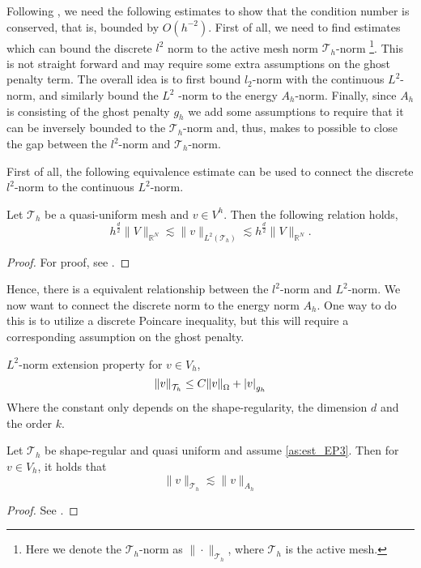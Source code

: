  Following \cite{gurkan2019stabilized}, we need the following estimates to show that the condition number is conserved, that is, bounded by $O( h^{-2}) $. First of all, we need to find estimates which can bound the discrete $l^{2}$ norm to the active
 mesh norm  $\mathcal{T} _{h}$-norm \footnote{Here we denote the $\mathcal{T} _{h}$-norm as $\| \cdot  \|_{\mathcal{T} _{h}  }^{  } $, where $\mathcal{T} _{h}$ is the active mesh.}. This is not straight forward and may require some extra
 assumptions on the ghost penalty term. The overall idea is to first bound $l_{2}$-norm with the continuous $L^{2}$-norm, and similarly bound the $L^{2}$ -norm to the energy $A_{h}$-norm. Finally, since $A_{h}$ is consisting of the ghost penalty $g_{h}$ we add
 some assumptions to require that it can be inversely bounded to the $\mathcal{T} _{h}$-norm and, thus, makes to possible to close the gap between the $l^{2}$-norm and $\mathcal{T} _{h}$-norm.

 First of all, the following equivalence estimate can be used to connect the discrete $l^{2}$-norm to the continuous $L^{2} $-norm.
 \begin{proposition}
 \label{prop:inverse_relation}
     Let $\mathcal{T}_{h} $ be a quasi-uniform mesh and $v \in V^{h}$. Then the following relation holds,
 \begin{equation}
 h^{\frac{d}{2}} \| V \|_{ \mathbb{R} ^{N} }^{  }  \lesssim \| v \|_{ L^2( \mathcal{T} _{h})  }^{  } \lesssim h^{\frac{d}{2}} \| V \|_{\mathbb{R} ^{N}  }^{  }.
 \end{equation}
 \end{proposition}
 \begin{proof}
     For proof, see \cite[Lemma A.1]{ern2006evaluation}.
 \end{proof}
 Hence, there is a equivalent relationship between the $l^{2} $-norm and $L^{2}$-norm. We now want to connect the discrete norm to the energy norm $A_{h}$. One way to do this is to utilize a discrete Poincare inequality, but this will require a corresponding
 assumption on the ghost penalty.

 \begin{assumption}[EP3]
     \label{as:est_EP3}
$L^2$-norm extension property for $ v \in  V_h$,
 \[
 \| v \|_{ \mathcal{T}_{h}  }^{  } \le  C \| v \|_{ \Omega  }^{  }  + \left\lvert  v  \right\rvert _{g_{h}}
 \]
 Where the constant only depends on the shape-regularity, the dimension $d$ and the order $k$.
 \end{assumption}


 \begin{proposition}
     Let $\mathcal{T}_{h} $ be shape-regular and quasi uniform and assume \ref{as:est_EP3}. Then for $v \in V_{h}$, it holds that \[
     \| v \|_{ \mathcal{T} _{h} }^{  } \lesssim \| v \|_{ A_{h} }^{  }
     \]

 \end{proposition}
\begin{proof}
    See \cite{gurkan2019stabilized}.
\end{proof}



